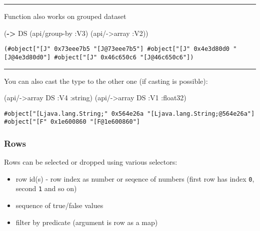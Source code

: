 \documentclass[]{article}
\newenvironment{Shaded}{\begin{snugshade}}{\end{snugshade}}
\newcommand{\KeywordTok}[1]{\textcolor[rgb]{0.13,0.29,0.53}{\textbf{#1}}}
\newcommand{\AttributeTok}[1]{\textcolor[rgb]{0.77,0.63,0.00}{#1}}
\newcommand{\NormalTok}[1]{#1}
\providecommand{\tightlist}{%
  \setlength{\itemsep}{0pt}\setlength{\parskip}{0pt}}
\begin{document}
\begin{center}\rule{0.5\linewidth}{0.5pt}\end{center}

Function also works on grouped dataset

\begin{Shaded}
\begin{Highlighting}[]
\NormalTok{(}\KeywordTok{->}\NormalTok{ DS}
\NormalTok{    (api/group-by }\AttributeTok{:V3}\NormalTok{)}
\NormalTok{    (api/->array }\AttributeTok{:V2}\NormalTok{))}
\end{Highlighting}
\end{Shaded}

\begin{verbatim}
(#object["[J" 0x73eee7b5 "[J@73eee7b5"] #object["[J" 0x4e3d80d0 "[J@4e3d80d0"] #object["[J" 0x46c650c6 "[J@46c650c6"])
\end{verbatim}

\begin{center}\rule{0.5\linewidth}{0.5pt}\end{center}

You can also cast the type to the other one (if casting is possible):

\begin{Shaded}
\begin{Highlighting}[]
\NormalTok{(api/->array DS }\AttributeTok{:V4} \AttributeTok{:string}\NormalTok{)}
\NormalTok{(api/->array DS }\AttributeTok{:V1} \AttributeTok{:float32}\NormalTok{)}
\end{Highlighting}
\end{Shaded}

\begin{verbatim}
#object["[Ljava.lang.String;" 0x564e26a "[Ljava.lang.String;@564e26a"]
#object["[F" 0x1e600860 "[F@1e600860"]
\end{verbatim}

\subsubsection{Rows}\label{rows}

Rows can be selected or dropped using various selectors:

\begin{itemize}
\tightlist
\item
  row id(s) - row index as number or seqence of numbers (first row has
  index \texttt{0}, second \texttt{1} and so on)
\item
  sequence of true/false values
\item
  filter by predicate (argument is row as a map)
\end{itemize}
\end{document}
